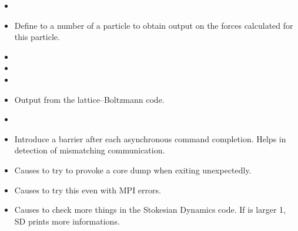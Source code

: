 \begin{itemize}
\item {}
\item {} Define to a number of a particle to
  obtain output on the forces calculated for this particle.
\item {}
\item {}
\item {}
\item {} Output from the lattice--Boltzmann code.
\item {}
\item {} Introduce a barrier after each
  asynchronous command completion. Helps in detection of mismatching
  communication.
\item {} Causes \es{} to try to provoke a core dump
  when exiting unexpectedly.
\item {} Causes \es{} to try this even with MPI errors.
\item {} Causes \es{} to check more things in the Stokesian
  Dynamics code. If  is larger 1, SD prints more informations.
\end{itemize}


